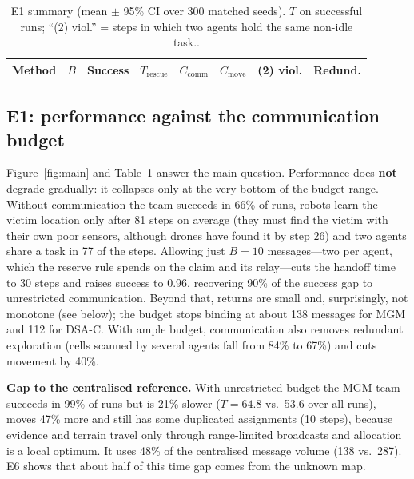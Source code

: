 \documentclass{article}
\begin{document}
\begin{table}[t]
\centering\small
\caption{E1 summary (mean $\pm$ 95\% CI over 300 matched seeds). $T$ on successful runs; ``(2) viol.'' = steps in
which two agents hold the same non-idle task..}\label{tab:main}
\begin{tabular}{@{}llcccccc@{}}
\toprule
Method & $B$ & Success & $T_{\mathrm{rescue}}$ & $C_{\mathrm{comm}}$ & $C_{\mathrm{move}}$ & (2) viol. & Redund. \\
\midrule

\bottomrule
\end{tabular}
\end{table}

\subsection{E1: performance against the communication budget}
Figure~\ref{fig:main} and Table~\ref{tab:main} answer the main question. Performance does \textbf{not} degrade
gradually: it collapses only at the very bottom of the budget range. Without communication the team succeeds in
66\% of runs, robots learn the victim location only after 81 steps on average (they must find the victim with their
own poor sensors, although drones have found it by step 26) and two agents share a task in 77 of the steps. Allowing
just $B=10$ messages---two per agent, which the reserve rule spends on the claim and its relay---cuts the handoff time
to 30 steps and raises success to 0.96, recovering 90\% of the success gap to unrestricted communication. Beyond that,
returns are small and, surprisingly, not monotone (see below); the budget stops binding at about 138 messages for MGM and
112 for DSA-C. With ample budget, communication also removes redundant exploration (cells scanned by several agents fall
from 84\% to 67\%) and cuts movement by 40\%.

\textbf{Gap to the centralised reference.} With unrestricted budget the MGM team succeeds in 99\% of runs but is 21\%
slower ($T=64.8$ vs.\ 53.6 over all runs), moves 47\% more and still has some duplicated assignments (10 steps), because
evidence and terrain travel only through range-limited broadcasts and allocation is a local optimum. It uses 48\% of the
centralised message volume (138 vs.\ 287). E6 shows that about half of this time gap comes from the unknown map.
\end{document}
